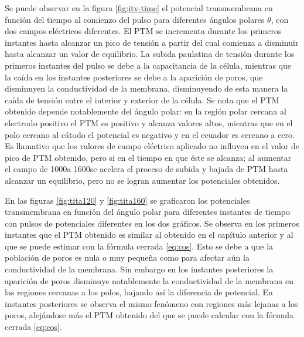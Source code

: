 Se puede observar en la figura \ref{fig:itv-time} el potencial transmembrana en función del tiempo al comienzo del pulso para diferentes ángulos polares $\theta$, con dos campos eléctricos diferentes. El PTM se incrementa durante los primeros instantes hasta alcanzar un pico de tensión a partir del cual comienza a disminuir hasta alcanzar un valor de equilibrio. La subida paulatina de tensión durante los primeros instantes del pulso se debe a la capacitancia de la célula, mientras que la caída en los instantes posteriores se debe a la aparición de poros, que disminuyen la conductividad de la membrana, disminuyendo de esta manera la caída de tensión entre el interior y exterior de la célula. Se nota que el PTM obtenido depende notablemente del ángulo polar: en la región polar cercana al electrodo positivo el PTM es positivo y alcanza valores altos, mientras que en el polo cercano al cátodo el potencial es negativo y en el ecuador es cercano a cero. Es llamativo que los valores de campo eléctrico aplicado no influyen en el valor de pico de PTM obtenido, pero si en el tiempo en que éste se alcanza; al aumentar el campo de 1000\vcm a 1600\vcm se acelera el proceso de subida y bajada de PTM hasta alcanzar un equilibrio, pero no se logran aumentar los potenciales obtenidos.




En las figuras \ref{fig:tita120} y \ref{fig:tita160} se graficaron los potenciales transmembrana en función del ángulo polar para diferentes instantes de tiempo con pulsos de potenciales diferentes en los dos gráficos. Se observa en los primeros instantes que el PTM obtenido es similar al obtenido en el capítulo anterior y al que se puede estimar con la fórmula cerrada \ref{eq:cos}. Esto se debe a que la población de poros es nula o muy pequeña como para afectar aún la conductividad de la membrana. Sin embargo en los instantes posteriores la aparición de poros disminuye notablemente la conductividad de la membrana en las regiones cercanas a los polos, bajando así la diferencia de potencial. En instantes posteriores se observa el mismo fenómeno con regiones más lejanas a los poros, alejándose más el PTM obtenido del que se puede calcular con la fórmula cerrada \ref{eq:cos}.\\

